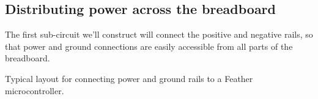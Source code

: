 \subsection{Distributing power across the breadboard}
The first sub-circuit we'll construct will connect the positive and negative rails, so that power and ground connections are easily accessible from all parts of the breadboard.
\begin{marginfigure}[-0cm]
	\begin{center}
		\caption[Power/ground rails connection schematic]{Typical layout for connecting power and ground rails to a Feather microcontroller.}
	\end{center}
\end{marginfigure}

